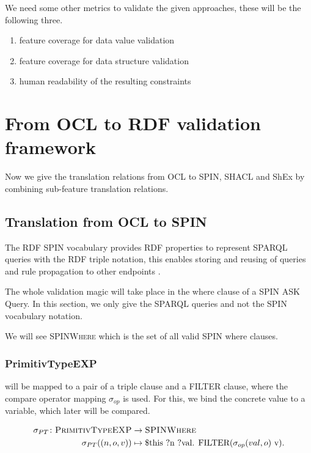 \documentclass[runningheads]{llncs}
\begin{document}
We need some other metrics to validate the given approaches, these will be the following three.
\begin{enumerate}
    \item feature coverage for data value validation
    \item feature coverage for data structure validation
    \item human readability of the resulting constraints
\end{enumerate}
\section{From OCL to RDF validation framework}
\label{OCL2RDFVal}
Now we give the translation relations from OCL to SPIN, SHACL and ShEx by combining sub-feature translation relations.
\subsection{Translation from OCL to SPIN}
The RDF SPIN vocabulary provides RDF properties to represent SPARQL queries with the RDF triple notation, this enables storing and reusing of queries and rule propagation to other endpoints \cite{knublauch2014spin}.

The whole validation magic will take place in the where clause of a SPIN ASK Query.
In this section, we only give the SPARQL queries and not the SPIN vocabulary notation.

We will see \textsc{SPINWhere} which is the set of all valid SPIN where clauses.
\subsubsection{PrimitivTypeEXP} will be mapped to a pair of a triple clause and a FILTER clause, where the compare operator mapping \(\sigma_{op}\) is used.
For this, we bind the concrete value to a variable, which later will be compared.
\begin{definition}
    \begin{align*}
        \sigma_{PT}\colon\textsc{PrimitivTypeEXP} & \to\textsc{SPINWhere}                                               \\
        \sigma_{PT}((n, o, v))                    & \mapsto \$\text{this ?n ?val. FILTER(}\sigma_{op}(val,o)\text{ v).}
    \end{align*}
\end{definition}
\end{document}
